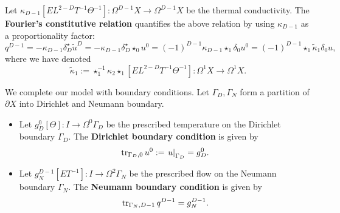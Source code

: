 \begin{discussion}
\begin{itemize}
      Let
      $\kappa_{D - 1} [E L^{2 - D} T^{-1} \Theta^{-1}]
      \colon \Omega^{D - 1} X \to \Omega^{D - 1} X$
      be the thermal conductivity.
      The \textbf{Fourier's constitutive relation}
      quantifies the above relation by using $\kappa_{D - 1}$
      as a proportionality factor:
      \begin{equation}
        q^{D - 1}
        = - \kappa_{D - 1} \delta_D^\star \tilde{u}^D
        = - \kappa_{D - 1} \delta_D^\star \star_0 u^0
        = (-1)^{D - 1} \kappa_{D - 1} \star_1 \delta_0 u^0
        = (-1)^{D - 1} \star_1 \tilde{\kappa}_1 \delta_0 u,
      \end{equation}
      where we have denoted
      \begin{equation}
        \tilde{\kappa}_1
        :=\star_1^{-1} \kappa_2 \star_1 [E L^{2 - D} T^{-1} \Theta^{-1}]
        \colon \Omega^1 X \to \Omega^1 X.
      \end{equation}
  \end{itemize}
  We complete our model with boundary conditions.
  Let $\Gamma_D, \Gamma_N$ form a partition of $\partial X$
  into Dirichlet and Neumann boundary.
  \begin{itemize}
    \item
      Let $g_D^0 [\Theta] \colon I \to \Omega^0 \Gamma_D$
      be the prescribed temperature on the Dirichlet boundary $\Gamma_D$.
      The \textbf{Dirichlet boundary condition} is given by
      \begin{equation}
        \mathop{\rm tr}\nolimits_{\Gamma_D, 0} u^0 := \left. u \right|_{\Gamma_D} = g_D^0.
      \end{equation}
    \item
      Let $g_N^{D - 1} [E T^{-1}] \colon I \to \Omega^2 \Gamma_N$
      be the prescribed flow on the Neumann boundary $\Gamma_N$.
      The \textbf{Neumann boundary condition} is given by
      \begin{equation}
        \mathop{\rm tr}\nolimits_{\Gamma_N, D - 1} q^{D - 1} = g_N^{D - 1}.
      \end{equation}
  \end{itemize}
\end{discussion}
